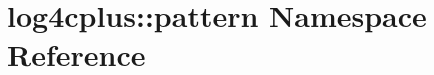 \hypertarget{namespacelog4cplus_1_1pattern}{\section{log4cplus\-:\-:pattern Namespace Reference}
\label{namespacelog4cplus_1_1pattern}
}
